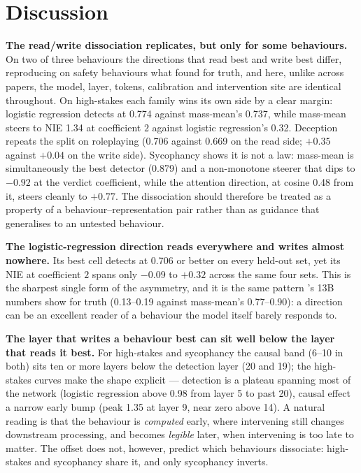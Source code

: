 \documentclass[conference]{IEEEtran}
\begin{document}
\section{Discussion}

\textbf{The read/write dissociation replicates, but only for some behaviours.}
On two of three behaviours the directions that read best and write best differ,
reproducing on safety behaviours what \citet{marks2024} found for truth, and
here, unlike across papers, the model, layer, tokens, calibration and
intervention site are identical throughout. On high-stakes each family wins its
own side by a clear margin: logistic regression detects at 0.774 against
mass-mean's 0.737, while mass-mean steers to NIE 1.34 at coefficient $2$
against logistic regression's 0.32. Deception repeats the split on roleplaying
(0.706 against 0.669 on the read side; $+0.35$ against $+0.04$ on the write
side). Sycophancy shows it is not a law: mass-mean is simultaneously the best
detector (0.879) and a non-monotone steerer that dips to $-0.92$ at the verdict
coefficient, while the attention direction, at cosine 0.48 from it, steers
cleanly to $+0.77$. The dissociation should therefore be treated as a property
of a behaviour--representation pair rather than as guidance that generalises to
an untested behaviour.

\textbf{The logistic-regression direction reads everywhere and writes almost
nowhere.} Its best cell detects at 0.706 or better on every held-out set, yet
its NIE at coefficient $2$ spans only $-0.09$ to $+0.32$ across the same four
sets. This is the sharpest single form of the asymmetry, and it is the same
pattern \citeauthor{marks2024}'s 13B numbers show for truth (0.13--0.19 against
mass-mean's 0.77--0.90): a direction can be an excellent reader of a behaviour
the model itself barely responds to.

\textbf{The layer that writes a behaviour best can sit well below the layer
that reads it best.} For high-stakes and sycophancy the causal band (6--10 in
both) sits ten or more layers below the detection layer (20 and 19); the
high-stakes curves make the shape explicit --- detection is a plateau spanning
most of the network (logistic regression above 0.98 from layer 5 to past 20),
causal effect a narrow early bump (peak 1.35 at layer 9, near zero above 14). A
natural reading is that the behaviour is \emph{computed} early, where
intervening still changes downstream processing, and becomes \emph{legible}
later, when intervening is too late to matter. The offset does not, however,
predict which behaviours dissociate: high-stakes and sycophancy share it, and
only sycophancy inverts.
\end{document}
